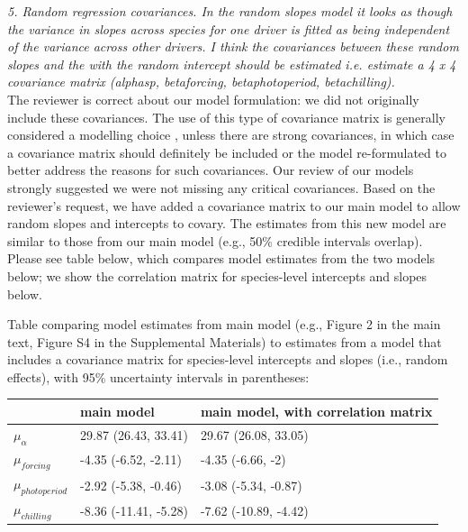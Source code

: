 \documentclass{article}
\begin{document}
\emph{5. Random regression covariances. In the random slopes model it looks as though the variance in
slopes across species for one driver is fitted as being independent of the variance across other
drivers. I think the covariances between these random slopes and the with the random
intercept should be estimated i.e. estimate a 4 x 4 covariance matrix (alphasp, betaforcing,
betaphotoperiod, betachilling).}\\

The reviewer is correct about our model formulation: we did not originally include these covariances. The use of this type of covariance matrix is generally considered a modelling choice \citep{gelman2006}, unless there are strong covariances, in which case a covariance matrix should definitely be included or the model re-formulated to better address the reasons for such covariances.  Our review of our models strongly suggested we were not missing any critical covariances. Based on the reviewer's request, we have added a covariance matrix to our main model to allow random slopes and intercepts to covary. The estimates from this new model are similar to those from our main model (e.g., 50\% credible intervals overlap). Please see table below, which compares model estimates from the two models below; we show the correlation matrix for species-level intercepts and slopes below.

Table comparing model estimates from main model (e.g., Figure 2 in the main text, Figure S4 in the Supplemental Materials) to estimates from a model that includes a covariance matrix for species-level intercepts and slopes (i.e., random effects), with 95\% uncertainty intervals in parentheses:

\begingroup\footnotesize
\begin{tabular}{|p{}|p{}|p{}|}
  \hline
 & main model & main model, with correlation matrix \\ 
  \hline
$\mu_{\alpha}$ & 29.87 (26.43, 33.41) & 29.67 (26.08, 33.05) \\ 
  $\mu_{forcing}$ & -4.35 (-6.52, -2.11) & -4.35 (-6.66, -2) \\ 
  $\mu_{photoperiod}$ & -2.92 (-5.38, -0.46) & -3.08 (-5.34, -0.87) \\ 
  $\mu_{chilling}$ & -8.36 (-11.41, -5.28) & -7.62 (-10.89, -4.42) \\ 
   \hline
\end{tabular}
\endgroup
\end{document}
